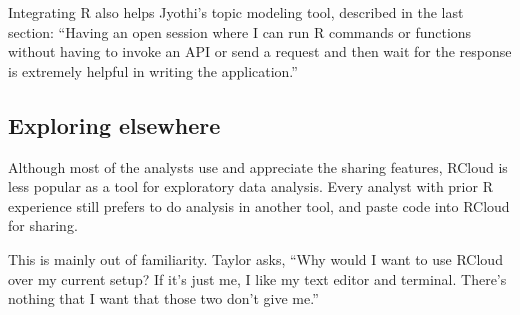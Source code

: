 Integrating R also helps Jyothi's topic modeling tool, described in the
last section: ``Having an open session where I can run R commands or
functions without having to invoke an API or send a request and then
wait for the response is extremely helpful in writing the application.''




\subsection{Exploring elsewhere}

Although most of the analysts use and appreciate the sharing features,
RCloud is less popular as a tool for exploratory data analysis. Every
analyst with prior R experience still prefers to do analysis in another
tool, and paste code into RCloud for sharing.

This is mainly out of familiarity. Taylor asks, ``Why would I want to use
RCloud over my current setup? If it's just me, I like my text editor and
terminal. There's nothing that I want that those two don't give me.''





